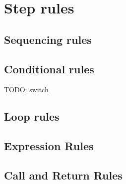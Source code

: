 \documentclass[acmsmall,review,anonymous]{acmart}\settopmatter{printfolios=true,printccs=false,printacmref=false}
\begin{document}
\section{Step rules}
\label{app:rules}

\subsection{Sequencing rules}

\dostepa
\dostepb
\seqstep
\seqskipstep
\seqcontinuestep
\seqbreakstep
\retvalstep
{}

\subsection{Conditional rules}

\ifstepa
\ifstepb

TODO: switch

\subsection{Loop rules}

\whilestep
\whiletruestep
\whilefalsestep
\whileskipcontinuestep
\whilebreakstep

\dowhilestep
\dowhileskipcontinuestep
\dowhilefalsestep
\dowhiletruestep
\dowhilebreakstep

\forinitstep
\forstep
\forfalsestep
\fortruestep
\forskiporcontinuestep
\forbreakstep
\forskippoststep

\subsection{Expression Rules}

\allocstep
\valofstep
\assignopstep
\postincstep
\assignstep
\varstep
\unopstep
\binopstep
\callexprstep

\subsection{Call and Return Rules}

\callstep
\returnstep
\end{document}
